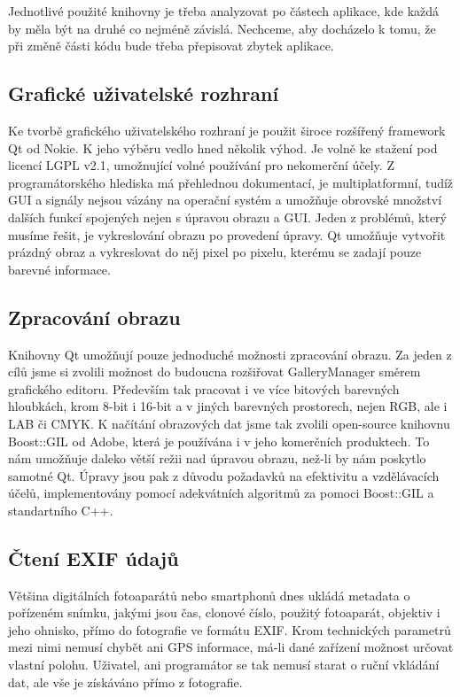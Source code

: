 \documentclass[11pt,twoside,a4paper]{book}
\begin{document}
\indent
Jednotlivé použité knihovny je třeba analyzovat po částech aplikace, kde každá by měla být na druhé co nejméně závislá. Nechceme, aby docházelo k tomu, že při změně části kódu bude třeba přepisovat zbytek aplikace.

\subsection{Grafické uživatelské rozhraní}
\indent
Ke tvorbě grafického uživatelského rozhraní je použit široce rozšířený framework Qt od Nokie. K jeho výběru vedlo hned několik výhod. Je volně ke stažení pod licencí LGPL v2.1, umožnující volné používání pro nekomerční účely. Z programátorského hlediska má přehlednou dokumentací, je multiplatformní, tudíž GUI a signály nejsou vázány na operační systém a umožňuje obrovské množství dalších funkcí spojených nejen s úpravou obrazu a GUI. Jeden z problémů, který musíme řešit, je vykreslování obrazu po provedení úpravy. Qt umožňuje vytvořit prázdný obraz a vykreslovat do něj pixel po pixelu, kterému se zadají pouze barevné informace.

\subsection{Zpracování obrazu}
\indent
Knihovny Qt umožňují pouze jednoduché možnosti zpracování obrazu. Za jeden z cílů jsme si zvolili možnost do budoucna rozšiřovat GalleryManager směrem grafického editoru. Především tak pracovat i ve více bitových barevných hloubkách, krom 8-bit i 16-bit a v jiných barevných prostorech, nejen RGB, ale i LAB či CMYK. K načítání obrazových dat jsme tak zvolili open-source knihovnu Boost::GIL od Adobe, která je používána i v jeho komerčních produktech. To nám umožňuje daleko větší režii nad úpravou obrazu, než-li by nám poskytlo samotné Qt. Úpravy jsou pak z důvodu požadavků na efektivitu a vzdělávacích účelů, implementovány pomocí adekvátních algoritmů za pomoci Boost::GIL a standartního C++.

\subsection{Čtení EXIF údajů}
\noindent
Většina digitálních fotoaparátů nebo smartphonů dnes ukládá metadata o pořízeném snímku, jakými jsou čas, clonové číslo, použitý fotoaparát, objektiv i jeho ohnisko, přímo do fotografie ve formátu EXIF. Krom technických parametrů mezi nimi nemusí chybět ani GPS informace, má-li dané zařízení možnost určovat vlastní polohu. Uživatel, ani programátor se tak nemusí starat o ruční vkládání dat, ale vše je získáváno přímo z fotografie.
\end{document}
